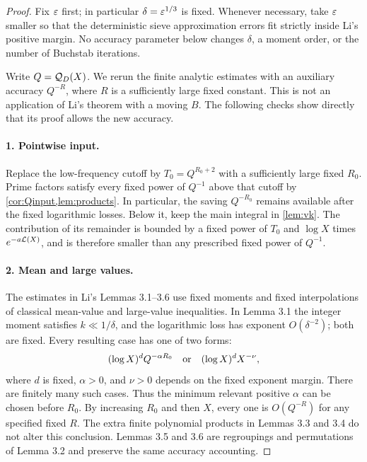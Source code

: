 \begin{proof}
Fix $\varepsilon$ first; in particular $\delta=\varepsilon^{1/3}$ is fixed.
Whenever necessary, take $\varepsilon$ smaller so that the deterministic
sieve approximation errors fit strictly inside Li's positive margin.
No accuracy parameter below changes $\delta$, a moment order, or the
number of Buchstab iterations.

Write $Q=\mathcal Q_D(X)$.
We rerun the finite analytic estimates with an auxiliary accuracy
$Q^{-R}$, where $R$ is a sufficiently large fixed constant.
This is not an application of Li's theorem with a moving $B$.
The following checks show directly that its proof allows the new
accuracy.

\paragraph{1. Pointwise input.}
Replace the low-frequency cutoff by $T_0=Q^{R_0+2}$ with a sufficiently
large fixed $R_0$. Prime factors satisfy every fixed power of $Q^{-1}$
above that cutoff by \cref{cor:Qinput,lem:products}.
In particular, the saving $Q^{-R_0}$ remains available after the
fixed logarithmic losses.
Below it, keep the main integral in \cref{lem:vk}.
The contribution of its remainder is bounded by a fixed power of
$T_0$ and $\log X$ times $e^{-a\mathcal L(X)}$, and is therefore smaller than
any prescribed fixed power of $Q^{-1}$.

\paragraph{2. Mean and large values.}
The estimates in Li's Lemmas 3.1--3.6 use fixed moments and fixed
interpolations of classical mean-value and large-value inequalities.
In Lemma 3.1 the integer moment satisfies $k\ll1/\delta$, and the
logarithmic loss has exponent $O(\delta^{-2})$; both are fixed.
Every resulting case has one of two forms:
\[
     (\log X)^d Q^{-\alpha R_0}
             \quad\hbox{or}\quad
     (\log X)^d X^{-\nu},
\]
where $d$ is fixed, $\alpha>0$, and $\nu>0$ depends on the fixed
exponent margin. There are finitely many such cases.
Thus the minimum relevant positive $\alpha$ can be chosen before
$R_0$. By increasing $R_0$ and then $X$, every one is
$O(Q^{-R})$ for any specified fixed $R$.
The extra finite polynomial products in Lemmas 3.3 and 3.4 do not
alter this conclusion. Lemmas 3.5 and 3.6 are regroupings and
permutations of Lemma 3.2 and preserve the same accuracy accounting.


\end{proof}
